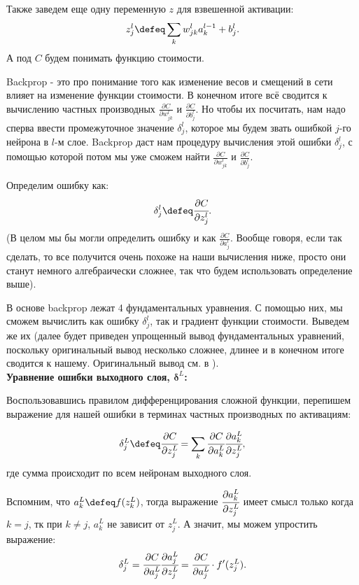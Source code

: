Также заведем еще одну переменную $z$ для взвешенной активации:
\begin{equation*}
    z_j^l \defeq \sum_k w_{jk}^l a_k^{l-1} + b_j^l.
\end{equation*}
А под $C$ будем понимать функцию стоимости.

Backprop - это про понимание того как изменение весов и смещений в сети 
влияет на изменение функции стоимости. В конечном итоге всё сводится 
к вычислению частных производных $\frac{\partial C}{\partial w_{jk}^l}$ и 
$\frac{\partial C}{\partial b_j^l}$. Но чтобы их посчитать, нам надо 
сперва ввести промежуточное значение $\delta_j^l$, которое мы будем звать 
ошибкой $j$-го нейрона в $l$-м слое. Backprop даст нам процедуру вычисления этой 
ошибки $\delta_j^l$, с помощью которой потом мы уже сможем найти 
$\frac{\partial C}{\partial w_{jk}^l}$ и $\frac{\partial C}{\partial b_j^l}$.

Определим ошибку как:
\begin{equation*}
    \delta_j^l \defeq \cfrac{\partial C}{\partial z_j^l}.
\end{equation*}
(В целом мы бы могли определить ошибку и как $\frac{\partial C}{\partial a_j^l}$. 
Вообще говоря, если так сделать, то все получится очень похоже на наши вычисления 
ниже, просто они станут немного алгебраически сложнее, так что будем использовать 
определение выше).

В основе backprop лежат 4 фундаментальных уравнения. С помощью них, мы сможем 
вычислить как ошибку $\delta_j^l$, так и градиент функции стоимости. Выведем же их 
(далее будет приведен упрощенный вывод фундаментальных уравнений, поскольку 
оригинальный вывод несколько сложнее, длинее и в конечном итоге сводится к нашему. 
Оригинальный вывод см. в \cite{backprop}).\\

\noindent\textbf{Уравнение ошибки выходного слоя, $\bm{\delta}^L$:}

Воспользовавшись правилом дифференцирования сложной функции, 
перепишем выражение для нашей ошибки в терминах частных производных 
по активациям:

\begin{equation*}
    \delta_j^L \defeq \cfrac{\partial C}{\partial z_j^L} = 
    \sum_k \cfrac{\partial C}{\partial a_k^L} \cfrac{\partial a_k^L}{\partial z_j^L}, 
\end{equation*}
где сумма происходит по всем нейронам выходного слоя. 

Вспомним, что $a_k^L \defeq f(z_k^L)$, тогда
выражение $\cfrac{\partial a_k^L}{\partial z_j^L}$ имеет смысл только когда $k=j$, 
тк при $k \neq j$, $a_k^L$ не зависит от $z_j^L$. А значит, мы можем упростить 
выражение:
\begin{equation*}
    \delta_j^L = \cfrac{\partial C}{\partial a_j^L} \cfrac{\partial a_j^L}{\partial z_j^L} 
    = \cfrac{\partial C}{\partial a_j^L} \cdot f'(z_j^L).
\end{equation*}

